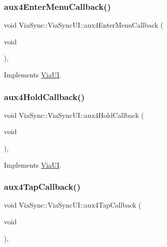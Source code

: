 \subsubsection{\texorpdfstring{aux4\+Enter\+Menu\+Callback()}{aux4EnterMenuCallback()}}
{\footnotesize\ttfamily void Via\+Sync\+::\+Via\+Sync\+U\+I\+::aux4\+Enter\+Menu\+Callback (\begin{DoxyParamCaption}\item[{void}]{ }\end{DoxyParamCaption})\hspace{0.3cm}{\ttfamily [override]}, {\ttfamily [virtual]}}



Implements \mbox{\hyperlink{class_via_u_i_a36cc4bac8f774c2a59ab8635be05f884}{Via\+UI}}.

\mbox{\label{class_via_sync_1_1_via_sync_u_i_a15f48c7e1d5f77292ee46d997421cd4e}} 
\subsubsection{\texorpdfstring{aux4\+Hold\+Callback()}{aux4HoldCallback()}}
{\footnotesize\ttfamily void Via\+Sync\+::\+Via\+Sync\+U\+I\+::aux4\+Hold\+Callback (\begin{DoxyParamCaption}\item[{void}]{ }\end{DoxyParamCaption})\hspace{0.3cm}{\ttfamily [override]}, {\ttfamily [virtual]}}



Implements \mbox{\hyperlink{class_via_u_i_a884790ab6dac8e6f49104146ff620512}{Via\+UI}}.

\mbox{\label{class_via_sync_1_1_via_sync_u_i_a1cf7ef02457d9f7887da0721799aadc0}} 
\subsubsection{\texorpdfstring{aux4\+Tap\+Callback()}{aux4TapCallback()}}
{\footnotesize\ttfamily void Via\+Sync\+::\+Via\+Sync\+U\+I\+::aux4\+Tap\+Callback (\begin{DoxyParamCaption}\item[{void}]{ }\end{DoxyParamCaption})\hspace{0.3cm}{\ttfamily [override]}, {\ttfamily [virtual]}}



